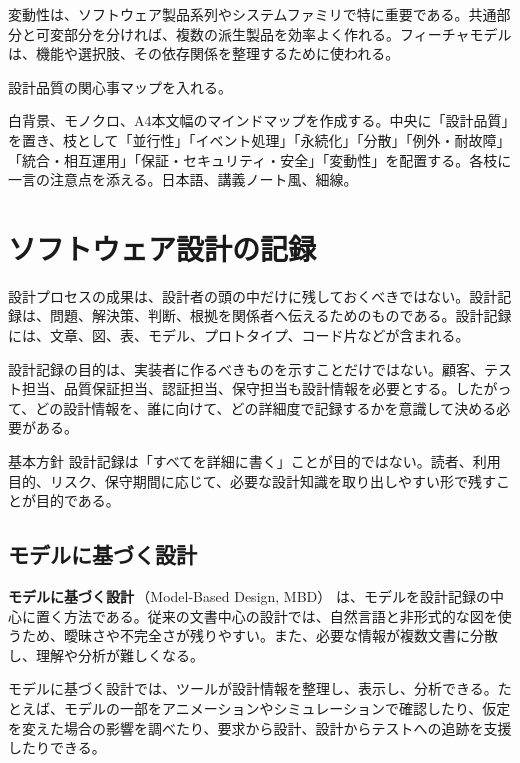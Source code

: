 \documentclass[10.5pt,a4paper]{ltjsarticle}
\newcommand{\term}[2]{\textbf{#1}\,（#2）}
\begin{document}
変動性は、ソフトウェア製品系列やシステムファミリで特に重要である。共通部分と可変部分を分ければ、複数の派生製品を効率よく作れる。フィーチャモデルは、機能や選択肢、その依存関係を整理するために使われる。

\begin{todobox}
設計品質の関心事マップを入れる。
\end{todobox}
\begin{promptbox}
白背景、モノクロ、A4本文幅のマインドマップを作成する。中央に「設計品質」を置き、枝として「並行性」「イベント処理」「永続化」「分散」「例外・耐故障」「統合・相互運用」「保証・セキュリティ・安全」「変動性」を配置する。各枝に一言の注意点を添える。日本語、講義ノート風、細線。
\end{promptbox}

\section{ソフトウェア設計の記録}

設計プロセスの成果は、設計者の頭の中だけに残しておくべきではない。設計記録は、問題、解決策、判断、根拠を関係者へ伝えるためのものである。設計記録には、文章、図、表、モデル、プロトタイプ、コード片などが含まれる。

設計記録の目的は、実装者に作るべきものを示すことだけではない。顧客、テスト担当、品質保証担当、認証担当、保守担当も設計情報を必要とする。したがって、どの設計情報を、誰に向けて、どの詳細度で記録するかを意識して決める必要がある。

\begin{pointbox}{基本方針}
設計記録は「すべてを詳細に書く」ことが目的ではない。読者、利用目的、リスク、保守期間に応じて、必要な設計知識を取り出しやすい形で残すことが目的である。
\end{pointbox}

\subsection{モデルに基づく設計}

\term{モデルに基づく設計}{Model-Based Design, MBD} は、モデルを設計記録の中心に置く方法である。従来の文書中心の設計では、自然言語と非形式的な図を使うため、曖昧さや不完全さが残りやすい。また、必要な情報が複数文書に分散し、理解や分析が難しくなる。

モデルに基づく設計では、ツールが設計情報を整理し、表示し、分析できる。たとえば、モデルの一部をアニメーションやシミュレーションで確認したり、仮定を変えた場合の影響を調べたり、要求から設計、設計からテストへの追跡を支援したりできる。
\end{document}
